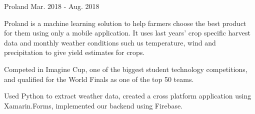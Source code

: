 \begin{cventries}
  \project
    {Proland} %
    {Mar. 2018 - Aug. 2018} %
    {
      \begin{cvitems}
        \item {Proland is a machine learning solution to help farmers choose the best product for them using only a mobile application. It uses last years' crop specific harvest data and monthly weather conditions such us temperature, wind and precipitation to give yield estimates for crops.}
        \item {Competed in Imagine Cup, one of the biggest student technology competitions, and qualified for the World Finals as one of the top 50 teams.}
        \item {Used Python to extract weather data, created a cross platform application using Xamarin.Forms, implemented our backend using Firebase.}
      \end{cvitems}
    }
\end{cventries}
